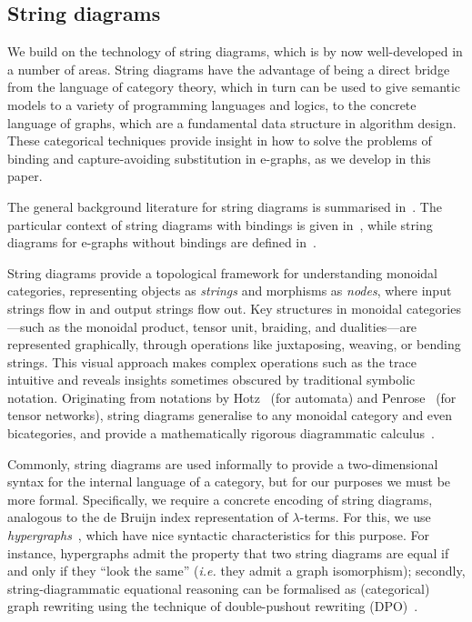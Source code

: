 \documentclass[]{IEEEtran}
\begin{document}
\subsection{String diagrams}

We build on the technology of string diagrams, which is by now well-developed in a number of areas. 
String diagrams have the advantage of being a direct bridge from the language of category theory, which in turn can be used to give semantic models to a variety of programming languages and logics, to the concrete language of graphs, which are a fundamental data structure in algorithm design.
These categorical techniques provide insight in how to solve the problems of binding and capture-avoiding substitution in e-graphs, as we develop in this paper.

The general background literature for string diagrams is summarised in~\cite{piedeleu2023introductionstringdiagramscomputer}.
The particular context of string diagrams with bindings is given in~\cite{ghica2024stringdiagramslambdacalculifunctional}, while string diagrams for e-graphs without bindings are defined in~\cite{ghica2024equivalencehypergraphsegraphsmonoidal}.

String diagrams provide a topological framework for understanding monoidal categories, representing objects as \emph{strings} and morphisms as \emph{nodes}, where input strings flow in and output strings flow out. 
Key structures in monoidal categories---such as the monoidal product, tensor unit, braiding, and dualities---are represented graphically, through operations like juxtaposing, weaving, or bending strings. 
This visual approach makes complex operations such as the trace intuitive and reveals insights sometimes obscured by traditional symbolic notation. 
Originating from notations by Hotz~\cite{hotzsd} (for automata) and Penrose~\cite{penrose1984spinors} (for tensor networks), string diagrams generalise to any monoidal category and even bicategories, and provide a mathematically rigorous diagrammatic calculus~\cite{joyal_geometry_1991}.

Commonly, string diagrams are used informally to provide a two-dimensional syntax for the internal language of a category, but for our purposes we must be more formal. 
Specifically, we require a concrete encoding of string diagrams, analogous to the de Bruijn index representation of $\lambda$-terms.
For this, we use \emph{hypergraphs}~\cite{bonchi_string_2022-1}, which have nice syntactic characteristics for this purpose.
For instance, hypergraphs admit the property that two string diagrams are equal if and only if they ``look the same'' (\emph{i.e.} they admit a graph isomorphism); secondly, string-diagrammatic equational reasoning can be formalised as (categorical) graph rewriting using the technique of double-pushout rewriting (DPO)~\cite{1011453502719}. 
\end{document}
